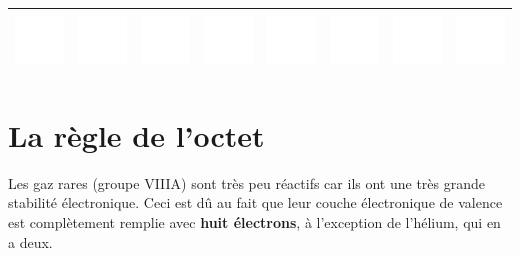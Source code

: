 \documentclass[
  11pt,
  french,
  a4paper,
  openany]{book}
\begin{document}
\begin{longtable}[]{@{}cccccccc@{}}
\includegraphics[width=\textwidth,height=4em]{images/1px.png} & \includegraphics[width=\textwidth,height=4em]{images/1px.png} & \includegraphics[width=\textwidth,height=4em]{images/1px.png} & \includegraphics[width=\textwidth,height=4em]{images/1px.png} & \includegraphics[width=\textwidth,height=4em]{images/1px.png} & \includegraphics[width=\textwidth,height=4em]{images/1px.png} & \includegraphics[width=\textwidth,height=4em]{images/1px.png} & \includegraphics[width=\textwidth,height=4em]{images/1px.png}\tabularnewline
\bottomrule
\end{longtable}

\hypertarget{la-ruxe8gle-de-loctet}{%
\section{La règle de l'octet}\label{la-ruxe8gle-de-loctet}}

Les gaz rares (groupe VIIIA) sont très peu réactifs car ils ont une très grande stabilité électronique. Ceci est dû au fait que leur couche électronique de valence est complètement remplie avec \textbf{huit électrons}, à l'exception de l'hélium, qui en a deux.
\end{document}
